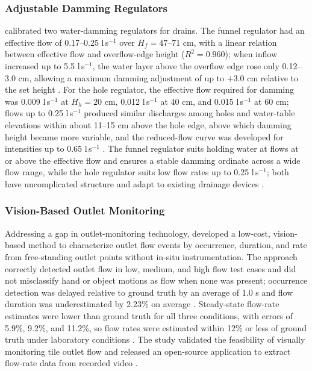\subsubsection{Adjustable Damming Regulators}

\textcite{Popek2021} calibrated two water-damming regulators for drains. The funnel
regulator had an effective flow of 0.17--0.25 l\,s$^{-1}$ over $H_f = 47$--71 cm, with a
linear relation between effective flow and overflow-edge height ($R^2 = 0.960$); when inflow
increased up to 5.5 l\,s$^{-1}$, the water layer above the overflow edge rose only
0.12--3.0 cm, allowing a maximum damming adjustment of up to $+3.0$ cm relative to the set
height \parencite{Popek2021}. For the hole regulator, the effective flow required for
damming was 0.009 l\,s$^{-1}$ at $H_h = 20$ cm, 0.012 l\,s$^{-1}$ at 40 cm, and
0.015 l\,s$^{-1}$ at 60 cm; flows up to 0.25 l\,s$^{-1}$ produced similar discharges among
holes and water-table elevations within about 11--15 cm above the hole edge, above which
damming height became more variable, and the reduced-flow curve was developed for
intensities up to 0.65 l\,s$^{-1}$ \parencite{Popek2021}. The funnel regulator suits
holding water at flows at or above the effective flow and ensures a stable damming ordinate
across a wide flow range, while the hole regulator suits low flow rates up to
0.25 l\,s$^{-1}$; both have uncomplicated structure and adapt to existing drainage devices
\parencite{Popek2021}.

\subsubsection{Vision-Based Outlet Monitoring}

Addressing a gap in outlet-monitoring technology, \textcite{Young2023} developed a
low-cost, vision-based method to characterize outlet flow events by occurrence, duration,
and rate from free-standing outlet points without in-situ instrumentation. The approach
correctly detected outlet flow in low, medium, and high flow test cases and did not
misclassify hand or object motions as flow when none was present; occurrence detection was
delayed relative to ground truth by an average of 1.0 s and flow duration was underestimated
by 2.23\% on average \parencite{Young2023}. Steady-state flow-rate estimates were lower than
ground truth for all three conditions, with errors of 5.9\%, 9.2\%, and 11.2\%, so flow
rates were estimated within 12\% or less of ground truth under laboratory conditions
\parencite{Young2023}. The study validated the feasibility of visually monitoring tile
outlet flow and released an open-source application to extract flow-rate data from recorded
video \parencite{Young2023}.


